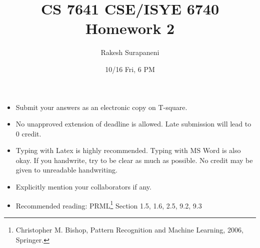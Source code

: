 \documentclass[twoside,10pt]{article}
\begin{document}
\title{CS 7641 CSE/ISYE 6740 Homework 2}
\author{Rakesh Surapaneni}
\date{ 10/16 Fri, 6 PM } 
\maketitle

\begin{itemize}
  \item Submit your answers as an electronic copy on T-square.
  \item No unapproved extension of deadline is allowed. Late
  submission will lead to 0 credit.
  \item Typing with Latex is highly recommended. Typing with MS Word is also okay.
  If you handwrite, try to be clear as much as possible. No credit may be given to unreadable handwriting.
  \item Explicitly mention your collaborators if any.
  \item Recommended reading: PRML\footnote{Christopher M. Bishop, Pattern Recognition and Machine
Learning, 2006, Springer.} Section 1.5, 1.6, 2.5, 9.2, 9.3

\end{itemize}
\end{document}
